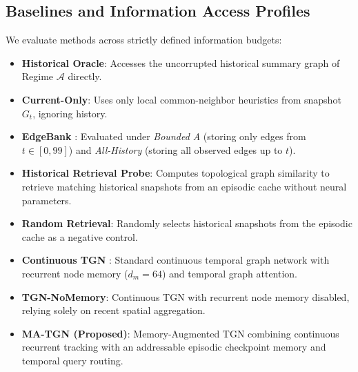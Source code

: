 \subsection{Baselines and Information Access Profiles}
We evaluate methods across strictly defined information budgets:
\begin{itemize}
    \item \textbf{Historical Oracle}: Accesses the uncorrupted historical summary graph of Regime $\mathcal{A}$ directly.
    \item \textbf{Current-Only}: Uses only local common-neighbor heuristics from snapshot $G_t$, ignoring history.
    \item \textbf{EdgeBank} \citep{poursafaei2022towards}: Evaluated under \textit{Bounded A} (storing only edges from $t \in [0, 99]$) and \textit{All-History} (storing all observed edges up to $t$).
    \item \textbf{Historical Retrieval Probe}: Computes topological graph similarity to retrieve matching historical snapshots from an episodic cache without neural parameters.
    \item \textbf{Random Retrieval}: Randomly selects historical snapshots from the episodic cache as a negative control.
    \item \textbf{Continuous TGN} \citep{rossi2020temporal}: Standard continuous temporal graph network with recurrent node memory ($d_m=64$) and temporal graph attention.
    \item \textbf{TGN-NoMemory}: Continuous TGN with recurrent node memory disabled, relying solely on recent spatial aggregation.
    \item \textbf{MA-TGN (Proposed)}: Memory-Augmented TGN combining continuous recurrent tracking with an addressable episodic checkpoint memory and temporal query routing.
\end{itemize}

